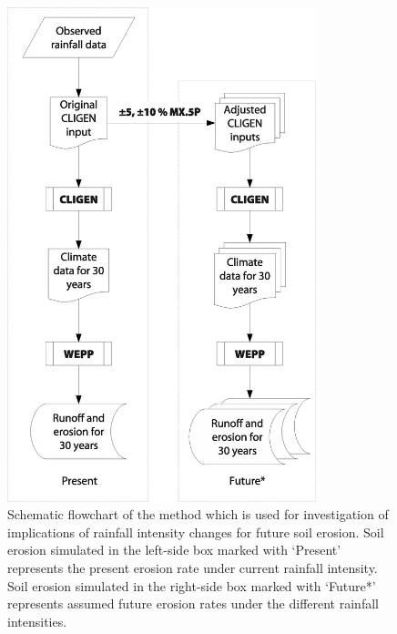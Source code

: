 \begin{figure}[htpb]
  \centering
\includegraphics[width=0.8\textwidth]{./img/future_erosion_flowchart}
  \caption[Schematic flowchart of the method used for investigation of
implications of rainfall intensity changes for future soil erosion]{Schematic
flowchart of the method which is used for investigation of implications of
rainfall intensity changes for future soil erosion. Soil erosion simulated in
the left-side box marked with `Present' represents the present erosion rate
under current rainfall intensity. Soil erosion simulated in the right-side box
marked with `Future*' represents assumed future erosion rates under the
different rainfall intensities.}
  \label{fig:future_erosion_flowchart}
\end{figure}

